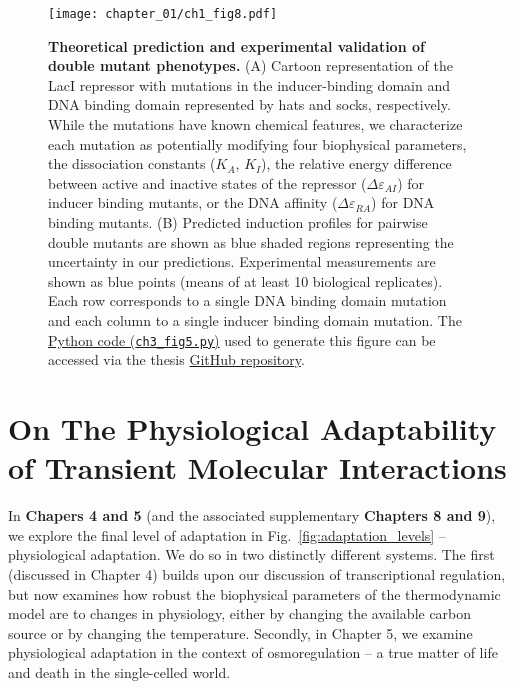 \documentclass[12pt]{caltech_thesis}
\begin{document}
\hypertarget{fig:double_muts_intro}{%
\begin{figure}
\centering
\texttt{[image: chapter\_01/ch1\_fig8.pdf]}
\caption[{Theoretical prediction and experimental validation of double
mutant phenotypes.}]{\textbf{Theoretical prediction and experimental
validation of double mutant phenotypes.} (A) Cartoon representation of
the LacI repressor with mutations in the inducer-binding domain and DNA
binding domain represented by hats and socks, respectively. While the
mutations have known chemical features, we characterize each mutation as
potentially modifying four biophysical parameters, the dissociation
constants (\(K_A\), \(K_I\)), the relative energy difference between
active and inactive states of the repressor (\(\Delta\varepsilon_{AI}\))
for inducer binding mutants, or the DNA affinity
(\(\Delta\varepsilon_{RA}\)) for DNA binding mutants. (B) Predicted
induction profiles for pairwise double mutants are shown as blue shaded
regions representing the uncertainty in our predictions. Experimental
measurements are shown as blue points (means of at least 10 biological
replicates). Each row corresponds to a single DNA binding domain
mutation and each column to a single inducer binding domain mutation.
The
\href{https://github.com/gchure/phd/blob/master/src/chapter_03/code/ch3_fig5.py}{Python
code (\texttt{ch3\_fig5.py})} used to generate this figure can be
accessed via the thesis \href{https://github.com/gchure/phd}{GitHub
repository}.}
\label{fig:double_muts_intro}
\end{figure}
}

\hypertarget{on-the-physiological-adaptability-of-transient-molecular-interactions}{%
\section{On The Physiological Adaptability of Transient Molecular
Interactions}\label{on-the-physiological-adaptability-of-transient-molecular-interactions}}

In \textbf{Chapers 4 and 5} (and the associated supplementary
\textbf{Chapters 8 and 9}), we explore the final level of adaptation in
Fig.~\ref{fig:adaptation_levels} -- physiological adaptation. We do so
in two distinctly different systems. The first (discussed in Chapter 4)
builds upon our discussion of transcriptional regulation, but now
examines how robust the biophysical parameters of the thermodynamic
model are to changes in physiology, either by changing the available
carbon source or by changing the temperature. Secondly, in Chapter 5, we
examine physiological adaptation in the context of osmoregulation -- a
true matter of life and death in the single-celled world.
\end{document}

